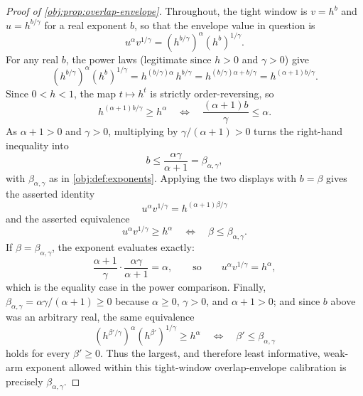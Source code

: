 \begin{proof}[Proof of \cref{obj:prop:overlap-envelope}]
Throughout, the tight window is \(v=h^b\) and \(u=h^{b/\gamma}\) for a real exponent \(b\), so that the envelope value in question is
\[
u^\alpha v^{1/\gamma}=\left(h^{b/\gamma}\right)^\alpha\left(h^{b}\right)^{1/\gamma}.
\]
For any real \(b\), the power laws (legitimate since \(h>0\) and \(\gamma>0\)) give
\[
\left(h^{b/\gamma}\right)^\alpha\left(h^{b}\right)^{1/\gamma}
=h^{(b/\gamma)\alpha}\,h^{b/\gamma}
=h^{(b/\gamma)\alpha+b/\gamma}
=h^{(\alpha+1)b/\gamma}.
\]
Since \(0<h<1\), the map \(t\mapsto h^t\) is strictly order-reversing, so
\[
h^{(\alpha+1)b/\gamma}\ge h^\alpha
\quad\Longleftrightarrow\quad
\frac{(\alpha+1)b}{\gamma}\le \alpha .
\]
As \(\alpha+1>0\) and \(\gamma>0\), multiplying by \(\gamma/(\alpha+1)>0\) turns the right-hand inequality into
\[
b\le \frac{\alpha\gamma}{\alpha+1}=\beta_{\alpha,\gamma},
\]
with \(\beta_{\alpha,\gamma}\) as in \cref{obj:def:exponents}. %
Applying the two displays with \(b=\beta\) gives the asserted identity
\[
u^\alpha v^{1/\gamma}=h^{(\alpha+1)\beta/\gamma}
\]
and the asserted equivalence
\[
u^\alpha v^{1/\gamma}\ge h^\alpha
\quad\Longleftrightarrow\quad
\beta\le\beta_{\alpha,\gamma}.
\]
If \(\beta=\beta_{\alpha,\gamma}\), the exponent evaluates exactly:
\[
\frac{\alpha+1}{\gamma}\cdot\frac{\alpha\gamma}{\alpha+1}=\alpha,
\qquad\text{so}\qquad
u^\alpha v^{1/\gamma}=h^\alpha,
\]
which is the equality case in the power comparison. %
Finally, \(\beta_{\alpha,\gamma}=\alpha\gamma/(\alpha+1)\ge0\) because \(\alpha\ge0\), \(\gamma>0\), and \(\alpha+1>0\); and since \(b\) above was an arbitrary real, the same equivalence
\[
\left(h^{\beta'/\gamma}\right)^\alpha\left(h^{\beta'}\right)^{1/\gamma}\ge h^\alpha
\quad\Longleftrightarrow\quad
\beta'\le\beta_{\alpha,\gamma}
\]
holds for every \(\beta'\ge0\). %
Thus the largest, and therefore least informative, weak-arm exponent allowed within this tight-window overlap-envelope calibration is precisely \(\beta_{\alpha,\gamma}\). %
\end{proof}

